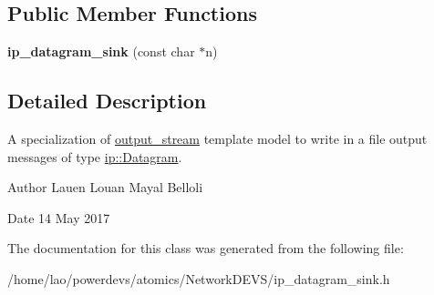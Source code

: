 \subsection*{Public Member Functions}
\begin{DoxyCompactItemize}
\item 
{\bfseries ip\+\_\+datagram\+\_\+sink} (const char $\ast$n)\hypertarget{classip__datagram__sink_a660e2f26390312a94d8e4a2fbc0e4614}{}\label{classip__datagram__sink_a660e2f26390312a94d8e4a2fbc0e4614}

\end{DoxyCompactItemize}


\subsection{Detailed Description}
A specialization of \hyperlink{classoutput__stream}{output\+\_\+stream} template model to write in a file output messages of type \hyperlink{structip_1_1Datagram}{ip\+::\+Datagram}. 

\begin{DoxyAuthor}{Author}
Lauen Louan Mayal Belloli 
\end{DoxyAuthor}
\begin{DoxyDate}{Date}
14 May 2017 
\end{DoxyDate}


The documentation for this class was generated from the following file\+:\begin{DoxyCompactItemize}
\item 
/home/lao/powerdevs/atomics/\+Network\+D\+E\+V\+S/ip\+\_\+datagram\+\_\+sink.\+h\end{DoxyCompactItemize}
